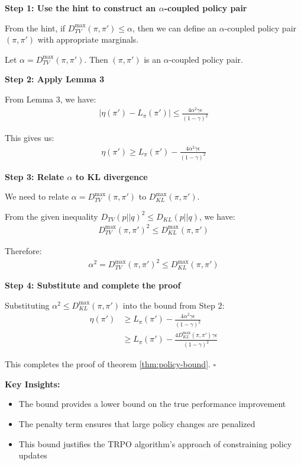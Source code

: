 \textbf{Step 1: Use the hint to construct an $\alpha$-coupled policy pair}

From the hint, if $D_{TV}^{\max} (\pi, \pi') \le \alpha$, then we can define an $\alpha$-coupled policy pair $(\pi, \pi')$ with appropriate marginals.

Let $\alpha = D_{TV}^{\max} (\pi, \pi')$. Then $(\pi, \pi')$ is an $\alpha$-coupled policy pair.

\textbf{Step 2: Apply Lemma 3}

From Lemma 3, we have:
\begin{align}
|\eta(\pi') - L_{\pi}(\pi')| \le \frac{4\alpha^2\gamma\epsilon}{(1-\gamma)^2}
\end{align}

This gives us:
\begin{align}
\eta(\pi') \ge L_{\pi}(\pi') - \frac{4\alpha^2\gamma\epsilon}{(1-\gamma)^2}
\end{align}

\textbf{Step 3: Relate $\alpha$ to KL divergence}

We need to relate $\alpha = D_{TV}^{\max} (\pi, \pi')$ to $D_{KL}^{\max}(\pi, \pi')$.

From the given inequality $D_{TV}(p||q)^2 \le D_{KL}(p||q)$, we have:
\begin{align}
D_{TV}^{\max} (\pi, \pi')^2 \le D_{KL}^{\max}(\pi, \pi')
\end{align}

Therefore:
\begin{align}
\alpha^2 = D_{TV}^{\max} (\pi, \pi')^2 \le D_{KL}^{\max}(\pi, \pi')
\end{align}

\textbf{Step 4: Substitute and complete the proof}

Substituting $\alpha^2 \le D_{KL}^{\max}(\pi, \pi')$ into the bound from Step 2:
\begin{align}
\eta(\pi') &\ge L_{\pi}(\pi') - \frac{4\alpha^2\gamma\epsilon}{(1-\gamma)^2} \\
&\ge L_{\pi}(\pi') - \frac{4D_{KL}^{\max}(\pi, \pi')\gamma\epsilon}{(1-\gamma)^2}
\end{align}

This completes the proof of theorem \ref{thm:policy-bound}. $\square$

\textbf{Key Insights:}
\begin{itemize}
    \item The bound provides a lower bound on the true performance improvement
    \item The penalty term ensures that large policy changes are penalized
    \item This bound justifies the TRPO algorithm's approach of constraining policy updates
\end{itemize}


